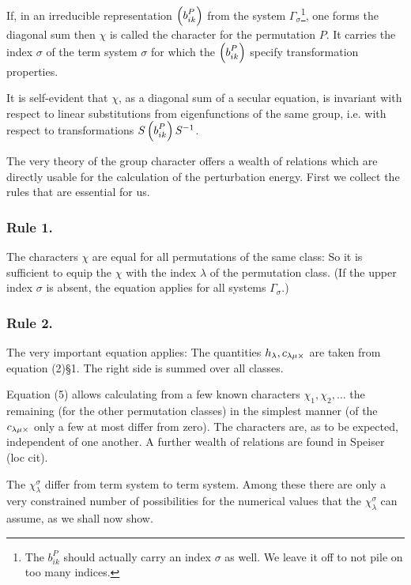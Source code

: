 \begin{paper}{1}
If, in an irreducible representation $\Aikp{b}{ik}{P}$ from the system $\Gamma_\sigma$\footnote{The $b_{ik}^P$ should actually carry an index $\sigma$ as well. We leave it off to not pile on too many indices.}, one forms the diagonal sum
then $\chi$ is called the character for the permutation $P$. It carries the index $\sigma$ of the term system $\sigma$ for which the $\Aikp{b}{ik}{P}$ specify transformation properties.

It is self-evident that $\chi$, as a diagonal sum of a secular equation, is invariant with respect to linear substitutions from eigenfunctions of the same group, i.e. with respect to transformations $S\Aikp{b}{ik}{P}S^{-1}$.

The very  theory of the group character offers a wealth of relations which are directly usable for the calculation of the perturbation energy. First we collect the rules that are essential for us. 

\subsubsection*{Rule 1.} The characters $\chi$ are equal for all permutations of the same class:
So it is sufficient to equip the $\chi$ with the index $\lambda$ of the permutation class. (If the upper index $\sigma$ is absent, the equation applies for all systems $\Gamma_\sigma$.)

\subsubsection*{Rule 2.} The very important equation applies:
The quantities $h_\lambda,c_{\lambda\mu\times}$ are taken from equation (2)\S 1. The right side is summed over all classes.

Equation (5) allows calculating from a few known characters $\chi_1,\chi_2,\dots$ the remaining (for the other permutation classes) in the simplest manner (of the $c_{\lambda\mu\times}$ only a few at most differ from zero). The characters are, as to be expected,  independent of one another. A further wealth of relations are found in Speiser (loc cit).

The $\chi_\lambda^\sigma$ differ from term system to term system. Among these there are only a very constrained number of possibilities for the numerical values that the $\chi_\lambda^\sigma$ can assume, as we shall now show.


\end{paper}
